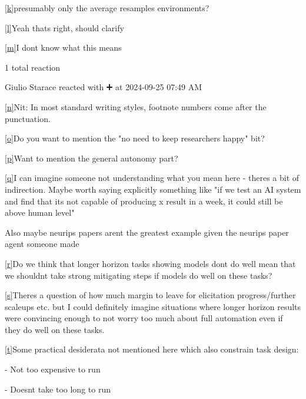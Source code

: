 \documentclass[
]{article}
\begin{document}
\label{cmnt11}\hyperref[cmnt_ref11]{{[}k{]}}{presumably
only the average resamples environments?}

\label{cmnt12}\hyperref[cmnt_ref12]{{[}l{]}}{Yeah
that\textquotesingle s right, should clarify}

\label{cmnt13}\hyperref[cmnt_ref13]{{[}m{]}}{I
don\textquotesingle t know what this means}

{1 total reaction}

{Giulio Starace reacted with ➕ at 2024-09-25 07:49 AM}

\label{cmnt14}\hyperref[cmnt_ref14]{{[}n{]}}{Nit: In most
standard writing styles, footnote numbers come after the punctuation.}

\label{cmnt15}\hyperref[cmnt_ref15]{{[}o{]}}{Do you want
to mention the "no need to keep researchers happy" bit?}

\label{cmnt16}\hyperref[cmnt_ref16]{{[}p{]}}{Want to
mention the general autonomy part?}

\label{cmnt17}\hyperref[cmnt_ref17]{{[}q{]}}{I can
imagine someone not understanding what you mean here -
there\textquotesingle s a bit of indirection. Maybe worth saying
explicitly something like "if we test an AI system and find that
it\textquotesingle s not capable of producing x result in a week, it
could still be above human level"}

{Also maybe neurips papers aren\textquotesingle t the greatest example
given the neurips paper agent someone made}

\label{cmnt18}\hyperref[cmnt_ref18]{{[}r{]}}{Do we think
that longer horizon tasks showing models don\textquotesingle t do well
mean that we shouldn\textquotesingle t take strong mitigating steps if
models do well on these tasks?}

\label{cmnt19}\hyperref[cmnt_ref19]{{[}s{]}}{There\textquotesingle s
a question of how much margin to leave for elicitation progress/further
scaleups etc. but I could definitely imagine situations where longer
horizon results were convincing enough to not worry too much about full
automation even if they do well on these tasks.}

\label{cmnt20}\hyperref[cmnt_ref20]{{[}t{]}}{Some
practical desiderata not mentioned here which also constrain task
design:}

{- Not too expensive to run}

{- Doesn\textquotesingle t take too long to run}
\end{document}
